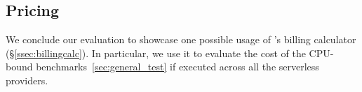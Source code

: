 \subsection{Pricing}
\label{sec:pricing}
We conclude our evaluation to showcase one possible usage of \sys's billing calculator (\S\ref{ssec:billingcalc}).
In particular, we use it to evaluate the cost of the CPU-bound benchmarks~\ref{sec:general_test} if executed across all the serverless providers.

%
